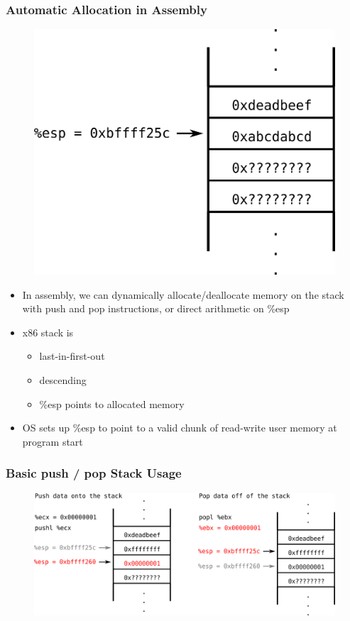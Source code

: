 \documentclass[11pt,xcolor=dvipsnames]{beamer}
\newcommand{\mvs}{\vspace{-0.95em}}
\begin{document}
\begin{frame}[fragile,t]
\frametitle{Automatic Allocation in Assembly}
\begin{figure}
\centering
\includegraphics[height=0.4\paperheight]{figures/stackplain.png}
\end{figure}
\begin{itemize}
  \item In assembly, we can dynamically allocate/deallocate memory on the stack with {\ttfamily push} and {\ttfamily pop} instructions, or direct arithmetic on {\ttfamily \%esp}
  \item x86 stack is
  \begin{itemize}
    \item last-in-first-out
    \item descending
    \item {\ttfamily \%esp} points to allocated memory
  \end{itemize}
  \item OS sets up {\ttfamily \%esp} to point to a valid chunk of read-write user memory at program start
\end{itemize}
\end{frame}

\begin{frame}[fragile]
\frametitle{Basic {\ttfamily push} / {\ttfamily pop} Stack Usage}
\mvs
\begin{figure}
\centering
\includegraphics[width=\textwidth]{figures/stackpushpop.png}
\end{figure}
\end{frame}
\end{document}
